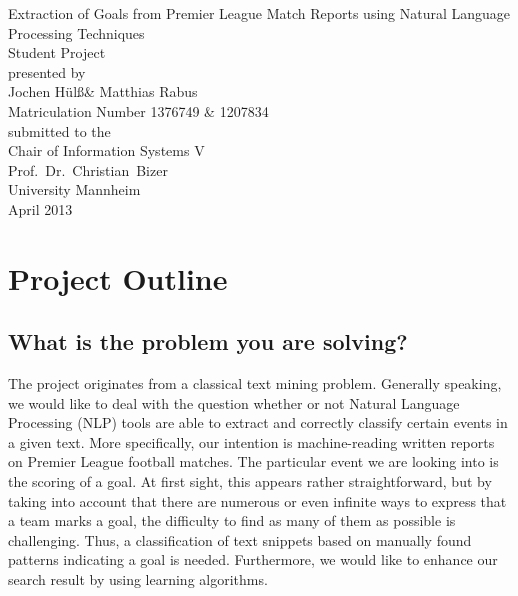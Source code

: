 \documentclass[11pt,titlepage,oneside,openany]{book}
\begin{document}
\begin{titlepage}
	\vspace*{2cm}
  \begin{center}
   {\Large Extraction of Goals from Premier League Match Reports using Natural Language Processing Techniques\\}
   \vspace{2cm} 
   {Student  Project\\}
   \vspace{2cm}
   {presented by\\
    Jochen H\"{u}l\ss \xspace  \&  Matthias Rabus \\
    Matriculation Number 1376749 \& 1207834 \\
   }
   \vspace{1cm} 
   {submitted to the\\
    Chair of Information Systems V\\
    Prof.\ Dr.\ Christian\ Bizer\\
    University Mannheim\\} \vspace{2cm}
   {April 2013}
  \end{center}
\end{titlepage} 

\tableofcontents
\newpage





\newpage



\chapter{Project Outline}
\section{What is the problem you are solving?}

The project originates from a classical text mining problem. Generally speaking, we would like to deal with the question whether or not Natural Language Processing (NLP) tools are able to extract and correctly classify certain events in a given text. More specifically, our intention is machine-reading written reports on Premier League football matches. The particular event we are looking into is the scoring of a goal. At first sight, this appears rather straightforward, but by taking into account that there are numerous or even infinite ways to express that a team marks a goal, the difficulty to find as many of them as possible is challenging. Thus, a classification of text snippets based on manually found patterns indicating a goal is needed. Furthermore, we would like to enhance our search result by using learning algorithms.  
\end{document}
